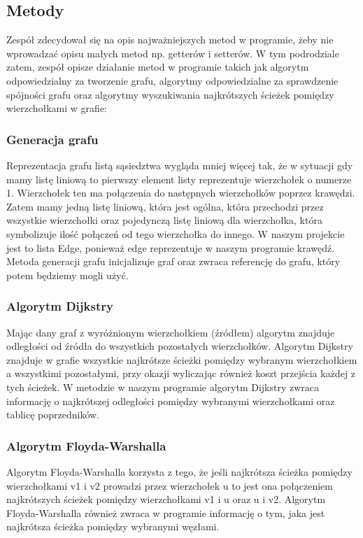 \documentclass[10pt]{article}
\begin{document}
\subsection{Metody}
Zespół zdecydował się na opis najważniejszych metod w programie, żeby nie wprowadzać opisu małych metod np. getterów i setterów. W tym podrodziale zatem, zespół opisze działanie metod w programie takich jak algorytm odpowiedzialny za tworzenie grafu, algorytmy odpowiedzialne za sprawdzenie spójności grafu oraz algorytmy wyszukiwania najkrótszych ścieżek pomiędzy wierzchołkami w grafie:
\subsubsection{Generacja grafu}
Reprezentacja grafu listą sąsiedztwa wygląda mniej więcej tak, że w sytuacji gdy mamy listę liniową to pierwszy element listy reprezentuje wierzchołek o numerze 1. Wierzchołek ten ma połączenia do następnych wierzchołków poprzez krawędzi. Zatem mamy jedną listę liniową, która jest ogólna, która przechodzi przez wszystkie wierzchołki oraz pojedynczą listę liniową dla wierzchołka, która symbolizuje ilość połączeń od tego wierzchołka do innego. W naszym projekcie jest to lista Edge, ponieważ edge reprezentuje w naszym programie krawędź. Metoda generacji grafu inicjalizuje graf oraz zwraca referencję do grafu, który potem będziemy mogli użyć. 
\subsubsection{Algorytm Dijkstry}
Mając dany graf z wyróżnionym wierzchołkiem (źródłem) algorytm znajduje odległości od źródła do wszystkich pozostałych wierzchołków. Algorytm Dijkstry znajduje w grafie wszystkie najkrótsze ścieżki pomiędzy wybranym wierzchołkiem a wszystkimi pozostałymi, przy okazji wyliczając również koszt przejścia każdej z tych ścieżek. W metodzie w naszym programie algorytm Dijkstry zwraca informację o najkrótszej odległości pomiędzy wybranymi wierzchołkami oraz tablicę poprzedników.
\subsubsection{Algorytm Floyda-Warshalla}
Algorytm Floyda-Warshalla korzysta z tego, że jeśli najkrótsza ścieżka pomiędzy wierzchołkami v1 i v2 prowadzi przez wierzchołek u to jest ona połączeniem najkrótszych ścieżek pomiędzy wierzchołkami v1 i u oraz u i v2. Algorytm Floyda-Warshalla również zwraca w programie informację o tym, jaka jest najkrótsza ścieżka pomiędzy wybranymi węzłami.
\newpage
\end{document}
